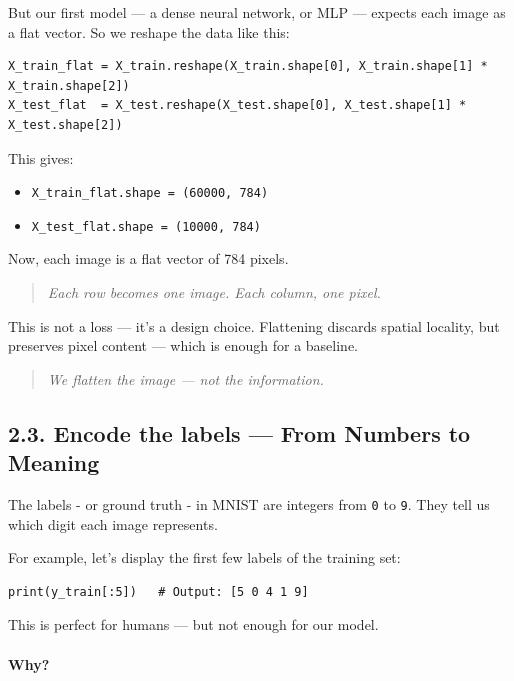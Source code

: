 \documentclass[11pt]{article}
\begin{document}
But our first model — a dense neural network, or MLP — expects each image as a flat vector.  
So we reshape the data like this:

\begin{verbatim}
X_train_flat = X_train.reshape(X_train.shape[0], X_train.shape[1] * X_train.shape[2])
X_test_flat  = X_test.reshape(X_test.shape[0], X_test.shape[1] * X_test.shape[2])
\end{verbatim}

This gives:
\begin{itemize}
    \item \texttt{X\_train\_flat.shape = (60000, 784)}
    \item \texttt{X\_test\_flat.shape  = (10000, 784)}
\end{itemize}

\noindent Now, each image is a flat vector of 784 pixels.

\begin{quote}
\textit{Each row becomes one image. Each column, one pixel.}
\end{quote}


This is not a loss — it’s a design choice.  
Flattening discards spatial locality, but preserves pixel content — which is enough for a baseline.

\begin{quote}
\textit{We flatten the image — not the information.}
\end{quote}

\subsection*{2.3. Encode the labels — From Numbers to Meaning}

The labels - or ground truth - in MNIST are integers from \texttt{0} to \texttt{9}. They tell us which digit each image represents.

\medskip

For example, let's display the first few labels of the training set:
\begin{verbatim}
print(y_train[:5])   # Output: [5 0 4 1 9]
\end{verbatim}

This is perfect for humans — but not enough for our model.

\paragraph{Why?}
\end{document}
